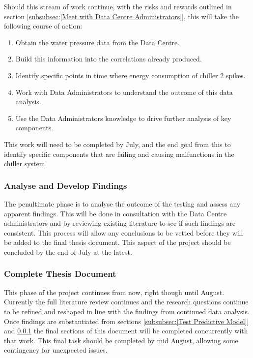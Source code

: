 \documentclass[12pt]{scrartcl}
\begin{document}
Should this stream of work continue, with the risks and rewards outlined in section \ref{subsubsec:[Meet with Data Centre Administrators]}, this will take the following course of action: 

\begin{enumerate}
\item Obtain the water pressure data from the Data Centre. 
\item Build this information into the correlations already produced. 
\item Identify specific points in time where energy consumption of chiller 2 spikes. 
\item Work with Data Administrators to understand the outcome of this data analysis. 
\item Use the Data Administrators knowledge to drive further analysis of key components.  
\end{enumerate} 

This work will need to be completed by July, and the end goal from this to identify specific components that are failing and causing malfunctions in the chiller system. 

\subsubsection{Analyse and Develop Findings}
\label{subsubsec:[Analyse and Develop Findings]}

The penultimate phase is to analyse the outcome of the testing and assess any apparent findings. This will be done in consultation with the Data Centre administrators and by reviewing existing literature to see if such findings are consistent. This process will allow any conclusions to be vetted before they will be added to the final thesis document. This aspect of the project should be concluded by the end of July at the latest. 

\subsubsection{Complete Thesis Document}
\label{subsubsec:[Complete Thesis Document]}

This phase of the project continues from now, right though until August. Currently the full literature review continues and the research questions continue to be refined and reshaped in line with the findings from continued data analysis. Once findings are substantiated from sections \ref{subsubsec:[Test Predictive Model]} and \ref{subsubsec:[Analyse and Develop Findings]} the final sections of this document will be completed concurrently with that work. This final task should be completed by mid August, allowing some contingency for unexpected issues.   
\end{document}
